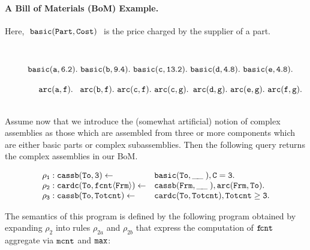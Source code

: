 \documentclass[11pt]{article}
\def\mt{\tt}
\newcommand{\cldl}{\[\begin{array}{ll}}
\newcommand{\eldl}{\end{array}\]\rm}
\newcommand{\prule}[2]{ \mt #1 \leftarrow & \mt #2 \\}
\def\inv{\vspace{-0.2cm}}
\def\sinv{\vspace{-0.1cm}}
\def\inv{\vspace{-0.2cm}}
\def\sinv{\vspace{-0.1cm}}
\def\f--{\tt{ \_\!\_\;}}
\begin{document}
\paragraph{\bf A  Bill of Materials  (BoM)  Example.} $\!\!$Here,  $\tt ~basic(Part, Cost)~$
is  the price charged by the supplier of a  part. 
 \begin{example}

~~

$\tt  ~~~~~~~~ basic(a,6.2).~ basic(b, 9.4).~ basic(c, 13.2).~ basic(d, 4.8).~ basic(e, 4.8).$

~~~~~~~~$\tt arc(a,f).$ $\tt ~arc(b, f).~ arc(c,f).~ arc(c,g).$ $\tt arc(d,g).~ arc(e,g).~arc(f, g).~$
\end{example}

~\\[-0.5cm]
Assume now that we introduce the (somewhat artificial) notion of complex assemblies  as those which are
assembled from three or more components which are either basic parts  or complex
subassemblies. Then the following query returns the complex assemblies in our BoM.

\sinv \begin{example}

 \label{ex:count}
\cldl
 \prule {\rho_1: cassb(To,  3)}{basic(To, \f--), C=3.}
 \prule{\rho_2:   cardc(To, fcnt\langle  Frm \rangle)}  {cassb(Frm, \f--),  arc(Frm, To).}
 \prule{\rho_3:  cassb(To, Totcnt)} { cardc(To, Totcnt),  Totcnt \geq 3.}
 \eldl
\end{example}
The semantics of this program is defined by the following program obtained by expanding  $\rho_2$ into  rules
$\rho_{2a}$ and $\rho_{2b}$ that express
the computation of  $\tt f\!cnt$ aggregate via $\tt mcnt$ and $\tt max$:\\[-0.1cm]
\end{document}
